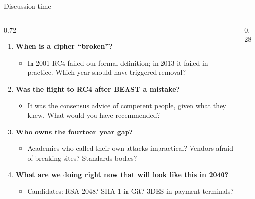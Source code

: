 \ifdefined\PRESENTATION\else\PassOptionsToClass{handout}{beamer}\fi\documentclass[aspectratio=169, lualatex]{beamer}
\begin{document}
\begin{frame}{Discussion time}
	\begin{columns}[c]
		\begin{column}{0.72\textwidth}
			\begin{enumerate}
				\item \textbf{When is a cipher ``broken''?}
				      \begin{itemize}
					      \item In 2001 RC4 failed our formal definition; in 2013 it failed in practice. Which year should have triggered removal?
				      \end{itemize}
				\item \textbf{Was the flight to RC4 after BEAST a mistake?}
				      \begin{itemize}
					      \item It was the consensus advice of competent people, given what they knew. What would you have recommended?
				      \end{itemize}
				\item \textbf{Who owns the fourteen-year gap?}
				      \begin{itemize}
					      \item Academics who called their own attacks impractical? Vendors afraid of breaking sites? Standards bodies?
				      \end{itemize}
				\item \textbf{What are we doing right now that will look like this in 2040?}
				      \begin{itemize}
					      \item Candidates: RSA-2048? SHA-1 in Git? 3DES in payment terminals?
				      \end{itemize}
			\end{enumerate}
		\end{column}
		\begin{column}{0.28\textwidth}
		\end{column}
	\end{columns}
\end{frame}

\begin{frame}[plain]
	\titlepage
\end{frame}
\end{document}
